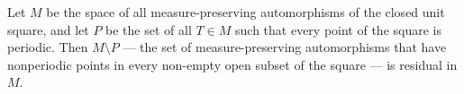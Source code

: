 Let $M$ be the space of all measure-preserving automorphisms of the closed unit square, and let $P$ be the set of all $T \in M$ such that every point of the square is periodic. Then $M \setminus P$ — the set of measure-preserving automorphisms that have nonperiodic points in every non-empty open subset of the square — is residual in $M$.

